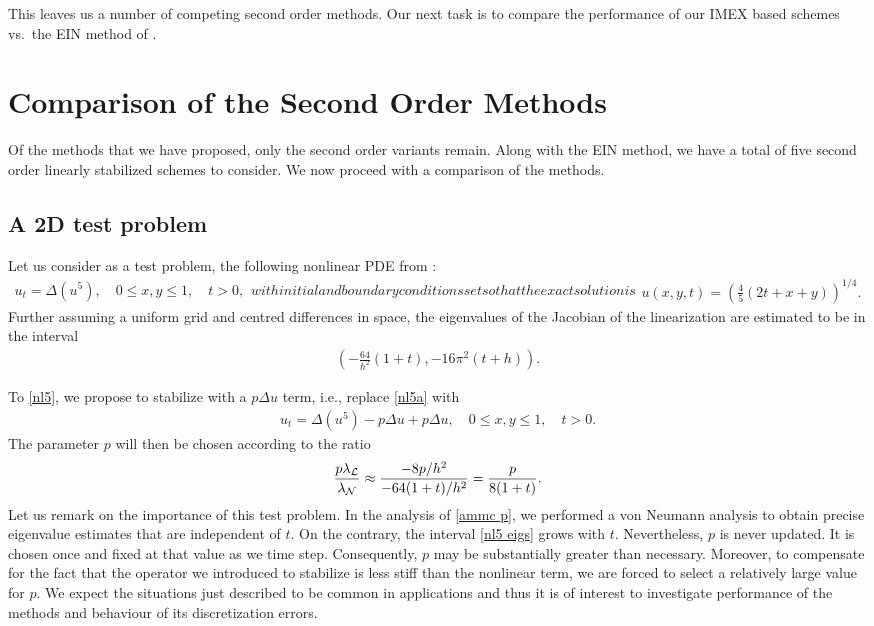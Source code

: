 This leaves us a number of competing second order methods. Our next task is to compare the performance of our IMEX based schemes vs.\ the EIN method of \cite{duchemin2014explicit}.

\section{Comparison of the Second Order Methods}
Of the methods that we have proposed, only the second order variants remain. Along with the EIN method, we have a total of five second order linearly stabilized schemes to consider. We now proceed with a comparison of the methods.

\subsection{A 2D test problem}
Let us consider as a test problem, the following nonlinear PDE from \cite{vdHouwen1982on}:
\begin{subequations}
        \begin{align}
                u_t = \Delta (u^5),
\quad 0\leq x,y\leq 1,
\quad t > 0,
\label{nl5a}
        \end{align}
with initial and boundary conditions set so that the exact solution is 
\begin{align}
u(x,y,t) = \left(\frac{4}{5}(2t+x+y)\right)^{1/4}.
\label{nl5b}
\end{align}
\label{nl5}%
\end{subequations}
Further assuming a uniform grid and centred differences in space, the eigenvalues of the Jacobian of the linearization are estimated to be in the interval
\begin{align}
        \left(-\frac{64}{h^2}(1+t), -16\pi^2(t+h) \right).
\label{nl5 eigs}
\end{align}

To \cref{nl5}, we propose to stabilize with a $p\Delta u$ term, i.e., replace \cref{nl5a} with 
\begin{align}
        u_t = \Delta (u^5) - p\Delta u + p\Delta u, \quad 0\leq x,y\leq 1,
\quad t > 0.
\label{nl5 p}
\end{align}
The parameter $p$ will then be chosen according to the ratio
\begin{align}
        \frac{p\lambda_{\mathcal{L}}}{\lambda_{\mathcal{N}}}
\approx \frac{-8p/h^2}{-64(1+t)/h^2}
= \frac{p}{8(1+t)}.
\end{align}
Let us remark on the importance of this test problem. In the analysis of \cref{ammc p}, we performed a von Neumann analysis to obtain precise eigenvalue estimates that are independent of $t$. On the contrary, the interval \cref{nl5 eigs} grows with $t$. Nevertheless, $p$ is never updated. It is chosen once and fixed at that value as we time step. Consequently, $p$ may be substantially greater than necessary. Moreover, to compensate for the fact that the operator we introduced to stabilize is less stiff than the nonlinear term, we are forced to select a relatively large value for $p$. We expect the situations just described to be common in applications and thus it is of interest to investigate performance of the methods and behaviour of its discretization errors.

